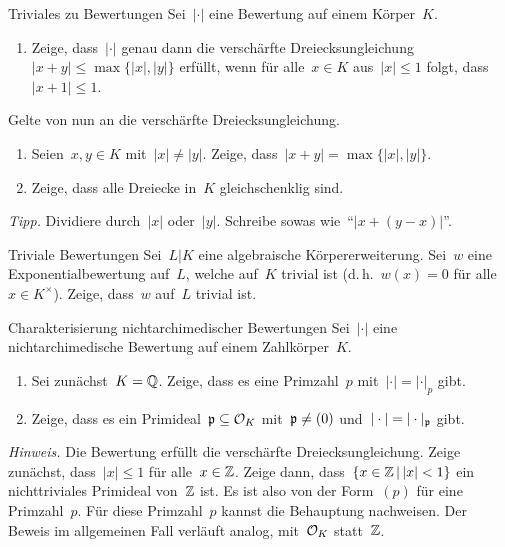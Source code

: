 \documentclass{uebblatt}
\begin{document}

\begin{aufgabe}{Triviales zu Bewertungen}
Sei~$|\cdot|$ eine Bewertung auf einem Körper~$K$.
\begin{enumerate}
\item Zeige, dass~$|\cdot|$ genau dann die verschärfte Dreiecksungleichung~$|x
+ y| \leq \max\{|x|,|y|\}$ erfüllt, wenn für alle~$x \in K$ aus~$|x| \leq 1$
folgt, dass~$|x + 1| \leq 1$.
\end{enumerate}
Gelte von nun an die verschärfte Dreiecksungleichung.
\begin{enumerate}
\addtocounter{enumi}{1}
\item Seien~$x,y \in K$ mit~$|x| \neq |y|$. Zeige, dass~$|x + y| = \max\{ |x|, |y| \}$.
\item Zeige, dass alle Dreiecke in~$K$ gleichschenklig sind.
\end{enumerate}
{\tiny\emph{Tipp.} Dividiere durch~$|x|$ oder~$|y|$. Schreibe sowas wie~"`$|x +
(y - x)|$"'.\par}
\end{aufgabe}

\begin{aufgabe}{Triviale Bewertungen}
Sei~$L|K$ eine algebraische Körpererweiterung. Sei~$w$ eine
Exponentialbewertung auf~$L$, welche auf~$K$ trivial ist (d.\,h.~$w(x) = 0$ für
alle~$x \in K^\times$). Zeige, dass~$w$ auf~$L$ trivial ist.
\end{aufgabe}

\begin{aufgabe}{Charakterisierung nichtarchimedischer Bewertungen}
Sei~$|\cdot|$ eine nichtarchimedische Bewertung auf einem Zahlkörper~$K$.
\begin{enumerate}
\item Sei zunächst~$K = \mathbb{Q}$. Zeige, dass es eine Primzahl~$p$ mit~$|\cdot| =
|\cdot|_p$ gibt.
\item Zeige, dass es ein Primideal~$\mathfrak{p} \subseteq \mathcal{O}_K$ mit~$\mathfrak{p} \neq (0)$
und~$|\cdot| = |\cdot|_{\mathfrak{p}}$ gibt.
\end{enumerate}
{\tiny\emph{Hinweis.} Die Bewertung erfüllt die verschärfte
Dreiecksungleichung. Zeige zunächst, dass~$|x| \leq 1$ für alle~$x \in \mathbb{Z}$.
Zeige dann, dass~$\{ x \in \mathbb{Z} \,|\, |x| < 1 \}$ ein nichttriviales Primideal
von~$\mathbb{Z}$ ist. Es ist also von der Form~$(p)$ für eine Primzahl~$p$. Für diese
Primzahl~$p$ kannst die Behauptung nachweisen. Der Beweis im allgemeinen Fall
verläuft analog, mit~$\mathcal{O}_K$ statt~$\mathbb{Z}$.\par}
\end{aufgabe}
\end{document}
